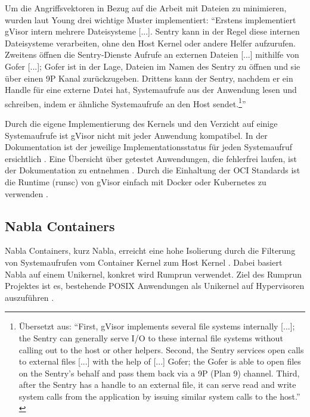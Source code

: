 Um die Angriffsvektoren in Bezug auf die Arbeit mit Dateien zu minimieren, wurden laut Young drei wichtige Muster implementiert: "`Erstens implementiert gVisor intern mehrere Dateisysteme [...]. Sentry kann in der Regel diese internen Dateisysteme verarbeiten, ohne den Host Kernel oder andere Helfer aufzurufen. Zweitens öffnen die Sentry-Dienste Aufrufe an externen Dateien [...] mithilfe von Gofer [...]; Gofer ist in der Lage, Dateien im Namen des Sentry zu öffnen und sie über einen 9P Kanal zurückzugeben. Drittens kann der Sentry, nachdem er ein Handle für eine externe Datei hat, Systemaufrufe aus der Anwendung lesen und schreiben, indem er ähnliche Systemaufrufe an den Host sendet.\footnote{Übersetzt aus: "`First, gVisor implements several file systems internally [...]; the Sentry can generally serve I/O to these internal file systems without calling out to the host or other helpers. Second, the Sentry services open calls to external files [...] with the help of [...] Gofer; the Gofer is able to open files on the Sentry’s behalf and pass them back via a 9P (Plan 9) channel. Third, after the Sentry has a handle to an external file, it can serve read and write system calls from the application by issuing similar system calls to the host."' \cite[][2]{EthanG.Young.2019}}"' \cite[][2]{EthanG.Young.2019}

Durch die eigene Implementierung des Kernels und den Verzicht auf einige Systemaufrufe ist gVisor nicht mit jeder Anwendung kompatibel. In der Dokumentation ist der jeweilige Implementationsstatus für jeden Systemaufruf ersichtlich \cite[vgl.][]{gVisor.20200122}. Eine Übersicht über getestet Anwendungen, die fehlerfrei laufen, ist der Dokumentation zu entnehmen \cite[vgl.][]{gVisor.20191025}.
Durch die Einhaltung der \ac{OCI} Standards ist die Runtime (runsc) von gVisor einfach mit Docker oder Kubernetes zu verwenden \cite[vgl.][108]{UdoSeidel.2018}.



\subsection{Nabla Containers}
\label{nabla}
Nabla Containers, kurz Nabla, erreicht eine hohe Isolierung durch die Filterung von Systemaufrufen vom Container Kernel zum Host Kernel \cite[vgl.][14]{Randal.28.04.2019}. Dabei basiert Nabla auf einem Unikernel, konkret wird Rumprun verwendet.
Ziel des Rumprun Projektes ist es, bestehende POSIX Anwendungen als Unikernel auf Hypervisoren auszuführen \cite[vgl.][256]{Jaworski.2020}.

